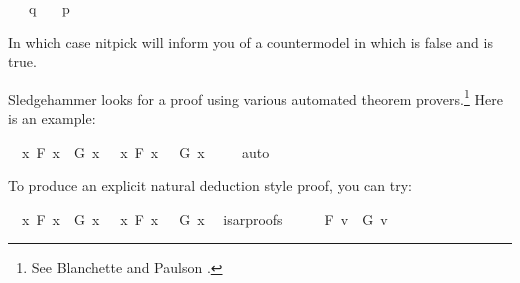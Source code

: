 \begin{isabellebody}
\ \ \ {\isachardoublequoteopen}q{\isachardoublequoteclose}\isanewline
\ \ \ {\isachardoublequoteopen}p{\isachardoublequoteclose}\ \isamarkupfalse%
%
\isadelimproof
\ %
\endisadelimproof
%
\isatagproof
{}\isamarkupfalse%
%
\endisatagproof
{\isafoldproof}%
%
\isadelimproof
%
\endisadelimproof
%
\begin{isamarkuptext}%
In which case nitpick will inform you of a countermodel in which   is false and 
 is true.%
\end{isamarkuptext}\isamarkuptrue%
%
\isadelimdocument
%
\endisadelimdocument
%
\isatagdocument
%
\isamarkuptrue%
%
\endisatagdocument
{\isafolddocument}%
%
\isadelimdocument
%
\endisadelimdocument
%
\begin{isamarkuptext}%
Sledgehammer looks for a proof using various automated theorem provers.\footnote{See Blanchette
and Paulson \cite{blanchette_hammering_2016}.} 
Here is an example:%
\end{isamarkuptext}\isamarkuptrue%
\isamarkupfalse%
\ {\isachardoublequoteopen}{\isacharparenleft}{\isasymforall}\ x{\isachardot}\ F\ x\ {\isasymlongrightarrow}\ G\ x{\isacharparenright}\ {\isasymor}\ {\isacharparenleft}{\isasymexists}\ x{\isachardot}\ F\ x\ {\isasymand}\ {\isasymnot}\ G\ x{\isacharparenright}{\isachardoublequoteclose}\ \isamarkupfalse%
\isanewline
%
\isadelimproof
\ \ %
\endisadelimproof
%
\isatagproof
{}\isamarkupfalse%
\ auto%
\endisatagproof
{\isafoldproof}%
%
\isadelimproof
%
\endisadelimproof
%
\begin{isamarkuptext}%
To produce an explicit natural deduction style proof, you can try:%
\end{isamarkuptext}\isamarkuptrue%
\isamarkupfalse%
\ {\isachardoublequoteopen}{\isacharparenleft}{\isasymforall}\ x{\isachardot}\ F\ x\ {\isasymlongrightarrow}\ G\ x{\isacharparenright}\ {\isasymor}\ {\isacharparenleft}{\isasymexists}\ x{\isachardot}\ F\ x\ {\isasymand}\ {\isasymnot}\ G\ x{\isacharparenright}{\isachardoublequoteclose}\ \isamarkupfalse%
\ {\isacharbrackleft}isar{\isacharunderscore}proofs{\isacharbrackright}\isanewline
%
\isadelimproof
%
\endisadelimproof
%
\isatagproof
{}\isamarkupfalse%
\ {\isacharminus}\isanewline
\isacommand{{\isacharbraceleft}}\isamarkupfalse%
\ \isamarkupfalse%
\ {\isachardoublequoteopen}{\isasymnot}\ F\ v{}{\isacharunderscore}{}\ {\isasymor}\ G\ v{}{\isacharunderscore}{}{\isachardoublequoteclose}\isanewline

\end{isabellebody}
